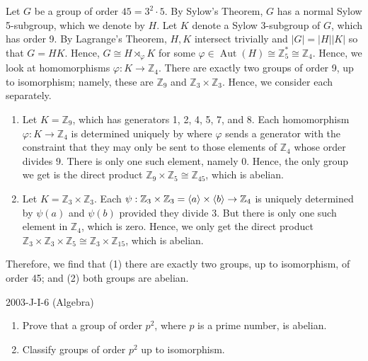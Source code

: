 \documentclass{article}
\begin{document}
\begin{solutions}
	Let $G$ be a group of order $45 = 3^{2} \cdot 5$. By Sylow's Theorem, $G$ has a normal Sylow 5-subgroup, which we denote by $H$. Let $K$ denote a Sylow 3-subgroup of $G$, which has order 9. By Lagrange's Theorem, $H, K$ intersect trivially and $|G| = |H||K|$ so that $G = HK$. Hence, $G \cong H \rtimes_{\varphi} K$ for some $\varphi \in \operatorname{Aut}(H) \cong \mathbb{Z}_{5}^{\ast} \cong \mathbb{Z}_{4}$. Hence, we look at homomorphisms $\varphi: K \to \mathbb{Z}_{4}$. There are exactly two groups of order 9, up to isomorphism; namely, these are $\mathbb{Z}_{9}$ and $\mathbb{Z}_{3} \times \mathbb{Z}_{3}$. Hence, we consider each separately. 
		\begin{enumerate}[itemsep=-2pt,label = (\Roman{*})]
			\item Let $K = \mathbb{Z}_{9}$, which has generators 1, 2, 4, 5, 7, and 8. Each homomorphism $\varphi: K \to \mathbb{Z}_{4}$ is determined uniquely by where $\varphi$ sends a generator with the constraint that they may only be sent to those elements of $\mathbb{Z}_{4}$ whose order divides $9$. There is only one such element, namely 0. Hence, the only group we get is the direct product $\mathbb{Z}_{9} \times \mathbb{Z}_{5} \cong \mathbb{Z}_{45}$, which is abelian. 
			\item Let $K = \mathbb{Z}_{3} \times \mathbb{Z}_{3}$. Each $\psi: \mathbb{Z}_{3} \times\mathbb{Z}_{3} = \braket{a} \times \braket{b} \to \mathbb{Z}_{4}$ is uniquely determined by $\psi(a)$ and $\psi(b)$ provided they divide $3$. But there is only one such element in $\mathbb{Z}_{4}$, which is zero. Hence, we only get the direct product $\mathbb{Z}_{3} \times \mathbb{Z}_{3} \times \mathbb{Z}_{5} \cong \mathbb{Z}_{3} \times \mathbb{Z}_{15}$, which is abelian. 
		\end{enumerate}
	Therefore, we find that (1) there are exactly two groups, up to isomorphism, of order 45; and (2) both groups are abelian. 
\end{solutions}
\begin{prb}{2003-J-I-6 (Algebra)}
	$ $\newline \vspace{-0.65cm}
	\begin{enumerate}[itemsep =-2pt,label = (\alph{*})]
		\item Prove that a group of order $p^{2}$, where $p$ is a prime number, is abelian. 
		\item Classify groups of order $p^{2}$ up to isomorphism. 
	\end{enumerate}
\end{prb}
\end{document}
